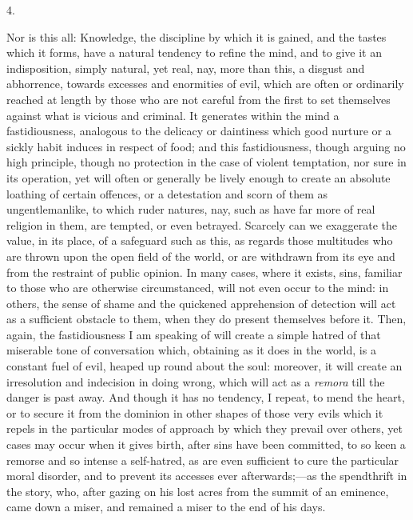 4.

Nor is this all: Knowledge, the discipline by which it is gained,
and the tastes which it forms, have a natural tendency to refine the
mind, and to give it an indisposition, simply natural, yet real, nay,
more than this, a disgust and abhorrence, towards excesses and
enormities of evil, which are often or ordinarily reached at length by
those who are not careful from the first to set themselves against
what is vicious and criminal. It generates within the mind a
fastidiousness, analogous to the delicacy or daintiness which good
nurture or a sickly habit induces in respect of food; and this
fastidiousness, though arguing no high principle, though no protection
in the case of violent temptation, nor sure in its operation, yet will
often or generally be lively enough to create an absolute loathing of
certain offences, or a detestation and scorn of them as
ungentlemanlike, to which ruder natures, nay, such as have far more of
real religion in them, are tempted, or even betrayed. Scarcely can we
exaggerate the value, in its place, of a safeguard such as this, as
regards those multitudes who are thrown upon the open field of the
world, or are withdrawn from its eye and from the restraint of public
opinion. In many cases, where it exists, sins, familiar to those who
are otherwise circumstanced, will not even occur to the mind: in
others, the sense of shame and the quickened apprehension of detection
will act as a sufficient obstacle to them, when they do present
themselves before it. Then, again, the fastidiousness I am speaking of
will create a simple hatred of that miserable tone of conversation
which, obtaining as it does in the world, is a constant fuel of evil,
heaped up round about the soul: moreover, it will create an
irresolution and indecision in doing wrong, which will act as a \emph{remora}
till the danger is past away. And though it has no tendency, I repeat,
to mend the heart, or to secure it from the dominion in other shapes
of those very evils which it repels in the particular modes of
approach by which they prevail over others, yet cases may occur when
it gives birth, after sins have been committed, to so keen a remorse
and so intense a self-hatred, as are even sufficient to cure the
particular moral disorder, and to prevent its accesses ever
afterwards;—as the spendthrift in the story, who, after gazing on
his lost acres from the summit of an eminence, came down a miser, and
remained a miser to the end of his days.

